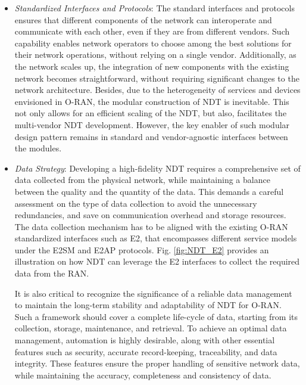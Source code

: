 \documentclass[]{IEEEtran}
\begin{document}
\begin{itemize}
	\item \emph{Standardized Interfaces and Protocols}: The standard interfaces and protocols ensures that different components of the network can interoperate and communicate with each other, even if they are from different vendors. Such capability enables network operators to choose among the best solutions for their network operations, without relying on a single vendor. Additionally, as the network scales up, the integration of new components with the existing network becomes straightforward, without requiring significant changes to the network architecture. Besides, due to the heterogeneity of services and devices envisioned in O-RAN, the modular construction of NDT is inevitable. This not only allows for an efficient scaling of the NDT, but also, facilitates the multi-vendor NDT development. However, the key enabler of such modular design pattern remains in standard and vendor-agnostic interfaces between the modules.
	\item \emph{Data Strategy}: Developing a high-fidelity NDT requires a comprehensive set of data collected from the physical network, while maintaining a balance between the quality and the quantity of the data. This demands a careful assessment on the type of data collection to avoid the unnecessary redundancies, and save on communication overhead and storage resources. The data collection mechanism has to be aligned with the existing O-RAN standardized interfaces such as E2, that encompasses different service models under the E2SM \cite{O-RAN.WG3.E2SM-RC-R003-v03.00} and E2AP \cite{O-RAN.WG3.E2AP-R003-v03.01} protocols.  Fig. \ref{fig:NDT_E2} provides an illustration on how NDT can leverage the E2 interfaces to collect the required data from the RAN.

It is also critical to recognize the significance of a reliable data management to maintain the long-term stability and adaptability of NDT for O-RAN. Such a framework should cover a complete life-cycle of data, starting from its collection, storage, maintenance, and retrieval. To achieve an optimal data management, automation is highly desirable, along with other essential features such as security, accurate record-keeping, traceability, and data integrity. These features ensure the proper handling of sensitive network data, while maintaining the accuracy, completeness and consistency of data.


\end{itemize}
\end{document}
